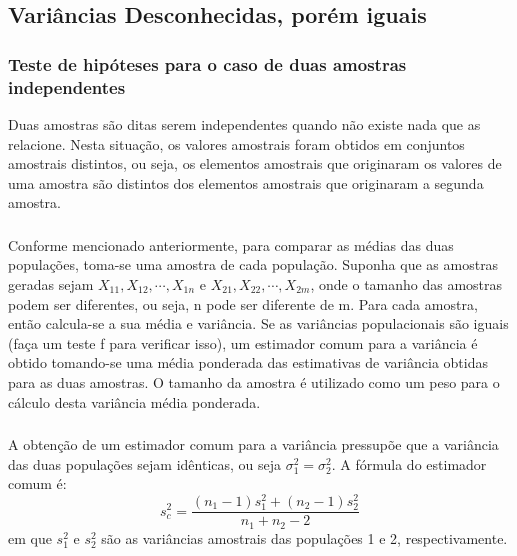 \documentclass[14pt,aspectratio=1610]{beamer}
\begin{document}
\subsection{Variâncias Desconhecidas, porém iguais}
\begin{frame}{}
\frametitle{Teste de hipóteses para o caso de duas amostras independentes}
\begin{block}{}
\justifying
Duas amostras são ditas serem independentes quando não existe nada que as relacione. Nesta situação, os valores amostrais foram obtidos em conjuntos amostrais distintos, ou seja, os elementos amostrais que originaram os valores de uma amostra são distintos dos elementos amostrais que originaram a segunda amostra.
\end{block}
\end{frame}

\begin{frame}{}
\frametitle{}
\begin{block}{}
\justifying
Conforme mencionado anteriormente, para comparar as médias das duas populações, toma-se uma amostra de cada população. Suponha que as amostras geradas sejam $X_{11},X_{12},\cdots,X_{1n}$ e $X_{21},X_{22},\cdots,X_{2m}$, onde o tamanho das amostras podem ser diferentes, ou seja, n pode ser diferente de m. Para cada amostra, então calcula-se a sua média e variância. Se as variâncias populacionais são iguais (faça um teste f para verificar isso), um estimador comum para a variância é obtido tomando-se uma média ponderada das estimativas de variância obtidas para as duas amostras. O tamanho da amostra é utilizado como um peso para o cálculo desta variância média ponderada.
\end{block}
\end{frame}

\begin{frame}{}
\frametitle{}
\begin{block}{}
\justifying
A obtenção de um estimador comum para a variância pressupõe que a variância das duas populações sejam idênticas, ou seja $\sigma^{2}_{1}=\sigma^{2}_{2}.$ A fórmula do estimador comum é:
$$s_{c}^{2}=\dfrac{(n_{1}-1)s_{1}^{2}+(n_{2}-1)s_{2}^{2}}{n_{1}+n_{2}-2}$$ em que $s_{1}^{2}$ e $s_{2}^{2}$ são as variâncias amostrais das populações 1 e 2, respectivamente. 
\end{block}
\end{frame}
\end{document}
